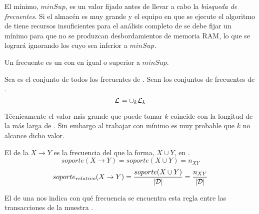\begin{Definition}
   El \soporte mínimo, $minSup$, es un valor fijado antes de llevar a cabo la \emph{búsqueda de} \itemsets \emph{frecuentes}. Si el almacén \D es muy grande y el equipo en que se ejecute el algoritmo de \arm tiene recursos insuficientes para el análisis completo de \D se debe fijar un \soporte mínimo para que no se produzcan desbordamientos de memoria RAM, lo que se logrará ignorando los \itemsets cuyo \soporte sea inferior a $minSup$.
\label{def:1-3-2-soporte-minimo}
\end{Definition}


\begin{Definition}
   Un \itemset frecuente es un \itemset con \soporte en \D igual o superior a $minSup$.
\label{def:1-3-2-itemset-frecuente}
\end{Definition}

\begin{Definition}
   Sea \aprioriL es el conjunto de todos los \itemsets frecuentes de \D. Sean \aprioriL[k] los conjuntos de \kitemsets frecuentes de \D.
  \begin{equation}\label{eq:1-3-2-cjto-kitemsets}
    \aprioriL = \cup_k{\aprioriL[k]}
  \end{equation}
\label{def:1-3-2-cjto-itemsets-frecuente}
\end{Definition}

Técnicamente el valor más grande que puede tomar $k$ coincide con la longitud de la \transaccion más larga de \D. Sin embargo al trabajar con \soporte mínimo es muy probable que $k$ no alcance dicho valor.


\begin{Definition}
  El \soporte de la \AR $X \rightarrow Y$ es la frecuencia del \itemset que la forma, $X \cup Y$, en \D.
  \begin{equation}\label{eq:1-3-2-soporte-AR-absoluto}
    soporte(X \rightarrow Y) = soporte(X \cup Y) = n_{XY}
  \end{equation}
  \begin{equation}\label{eq:1-3-2-soporte-AR}
    soporte_{relativo}(X \rightarrow Y) = \frac{soporte(X \cup Y)}{|\D|} = \frac{n_{XY}}{|\D|}
  \end{equation}
\label{def:1-3-2-soporte-AR}
\end{Definition}

El \soporte de una \ar nos indica con qué frecuencia se encuentra esta regla entre las transacciones de la muestra \D.

